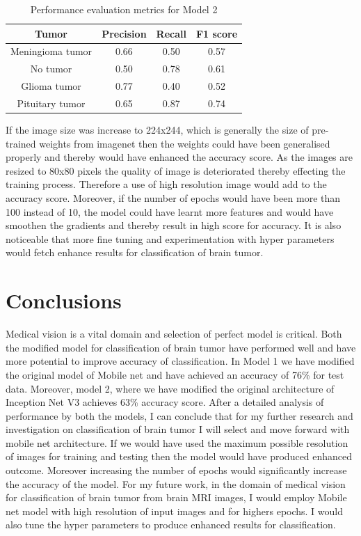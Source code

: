 \documentclass[12pt, a4paper,twoside]{report}
\theoremstyle{plain} %
\theoremstyle{definition} %
\theoremstyle{remark} %
\numberwithin{equation}{chapter}
\begin{document}
\begin{table}[h]
    \centering
    \begin{tabular}{|c|c|c|c|}
     \hline
    Tumor  & Precision & Recall & F1 score  \\  \hline
    Meningioma tumor & 0.66 & 0.50 & 0.57 \\
    No tumor & 0.50 & 0.78 & 0.61 \\
    Glioma tumor & 0.77 & 0.40 & 0.52 \\
    Pituitary tumor & 0.65 & 0.87 & 0.74 \\
    \hline
    \end{tabular}
    \caption{Performance evaluation metrics for Model 2}
    \label{tab:model2}
\end{table}


If the image size was increase to 224x244, which is generally the size of pre-trained weights from imagenet then the weights could have been generalised properly and thereby would have enhanced the accuracy score. As the images are resized to 80x80 pixels the quality of image is deteriorated thereby effecting the training process. Therefore a use of high resolution image would add to the accuracy score. Moreover, if the number of epochs would have been more than 100 instead of 10, the model could have learnt more features and would have 
smoothen the gradients and thereby result in high score for accuracy. It is also noticeable that more fine tuning and experimentation with hyper parameters would fetch enhance results for classification of brain tumor.


\chapter{Conclusions}\label{ch:concl}
Medical vision is a vital domain and selection of perfect model is critical. Both the modified model for classification of brain tumor have performed well and have more potential to improve accuracy of classification. In Model 1 we have modified the original model of Mobile net and have achieved an accuracy of 76\% for test data. Moreover, model 2, where we have modified the original architecture of Inception Net V3 achieves 63\% accuracy score. After a detailed analysis of performance by both the models, I can conclude that for my further research and investigation on classification of brain tumor I will select and move forward with mobile net architecture. If we would have used the maximum possible resolution of images for training and testing then the model would have produced enhanced outcome. Moreover increasing the number of epochs would significantly increase the accuracy of the model. For my future work, in the domain of medical vision for classification of brain tumor from brain MRI images, I would employ Mobile net model with high resolution of input images and for highers epochs. I would also tune the hyper parameters to produce enhanced results for classification. 
\end{document}
